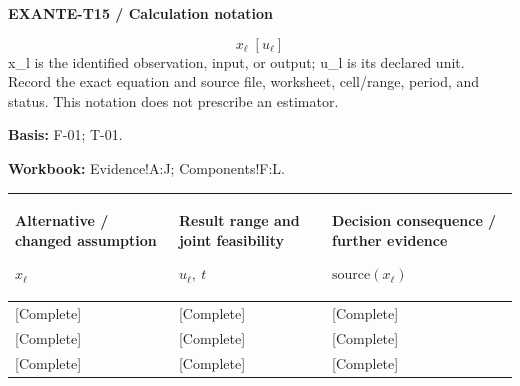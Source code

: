 \par\begingroup\sffamily\fontsize{8}{10}\selectfont\color{NEBGreen}\setlength{\parskip}{2pt}\setlength{\abovedisplayskip}{4pt}\setlength{\belowdisplayskip}{4pt}\setlength{\abovedisplayshortskip}{2pt}\setlength{\belowdisplayshortskip}{3pt}
\textbf{EXANTE-T15 / Calculation notation}\par
{\fontsize{9}{11}\selectfont\[ x_{\ell}\;[u_{\ell}] \]}
x\_l is the identified observation, input, or output; u\_l is its declared unit. Record the exact equation and source file, worksheet, cell/range, period, and status. This notation does not prescribe an estimator.\par
\textbf{Basis:} F-01; T-01.\par
\textbf{Workbook:} Evidence!A:J; Components!F:L.\par\endgroup
{\sffamily\fontsize{8.3}{10.3}\selectfont\begin{longtable}{@{}P{54.83mm} P{54.83mm} P{54.83mm}@{}}
\toprule
\textbf{Alternative / changed assumption}\par {\normalfont\fontsize{8.2}{10}\selectfont $x_{\ell}$} & \textbf{Result range and joint feasibility}\par {\normalfont\fontsize{8.2}{10}\selectfont $u_{\ell},\ t$} & \textbf{Decision consequence / further evidence}\par {\normalfont\fontsize{8.2}{10}\selectfont $\text{source}(x_{\ell})$}\\\midrule\endhead
\rule{0pt}{8mm}[Complete] & [Complete] & [Complete]\\\hline
\rule{0pt}{8mm}[Complete] & [Complete] & [Complete]\\\hline
\rule{0pt}{8mm}[Complete] & [Complete] & [Complete]\\\hline
\end{longtable}}
\par\begingroup\sffamily\fontsize{8}{10}\selectfont\color{NEBGreen}\setlength{\parskip}{2pt}\setlength{\abovedisplayskip}{4pt}\setlength{\belowdisplayskip}{4pt}\setlength{\abovedisplayshortskip}{2pt}\setlength{\belowdisplayshortskip}{3pt}
